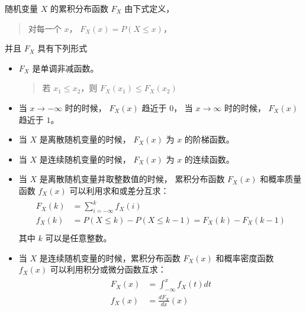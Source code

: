 \documentclass[letterpaper,10pt,english]{sphinxmanual}
\begin{document}
\begin{sphinxShadowBox}

随机变量 \(X\) 的累积分布函数 \(F_X\) 由下式定义，
\begin{quote}

对每一个 \(x\)， \(F_X(x) = P(X \le x)\)，
\end{quote}

并且 \(F_X\) 具有下列形式
\begin{itemize}
\item {} 
\(F_X\) 是单调非减函数。
\begin{quote}

若 \(x_1\le x_2\)，则 \(F_X(x_1) \le F_X(x_2)\)
\end{quote}

\item {} 
当 \(x \rightarrow -\infty\) 时的时候， \(F_X(x)\) 趋近于 \(0\)，
当 \(x \rightarrow \infty\) 时的时候， \(F_X(x)\) 趋近于 \(1\)。

\item {} 
当 \(X\) 是离散随机变量的时候， \(F_X(x)\) 为 \(x\) 的阶梯函数。

\item {} 
当 \(X\) 是连续随机变量的时候， \(F_X(x)\) 为 \(x\) 的连续函数。

\item {} 
当 \(X\) 是离散随机变量并取整数值的时候， 累积分布函数 \(F_X(x)\) 和概率质量函数 \(f_X(x)\)
可以利用求和或差分互求：
\begin{align}\label{equation:概率基础/content:概率基础/content:34}\!\begin{aligned}
F_X(k) &= \sum_{i=-\infty}^k f_X(i)\\
f_X(k) &= P(X \le k) - P(X \le k-1) =  F_X(k) -  F_X(k-1)\\
\end{aligned}\end{align}
其中 \(k\) 可以是任意整数。

\item {} 
当 \(X\) 是连续随机变量的时候，累积分布函数 \(F_X(x)\) 和概率密度函数 \(f_X(x)\)
可以利用积分或微分函数互求：
\begin{align}\label{equation:概率基础/content:概率基础/content:35}\!\begin{aligned}
F_X(x) &= \int_{-\infty}^x f_X(t) dt\\
f_X(x) &= \frac{d F_X }{dx} (x)\\
\end{aligned}\end{align}
\end{itemize}
\end{sphinxShadowBox}
\end{document}
